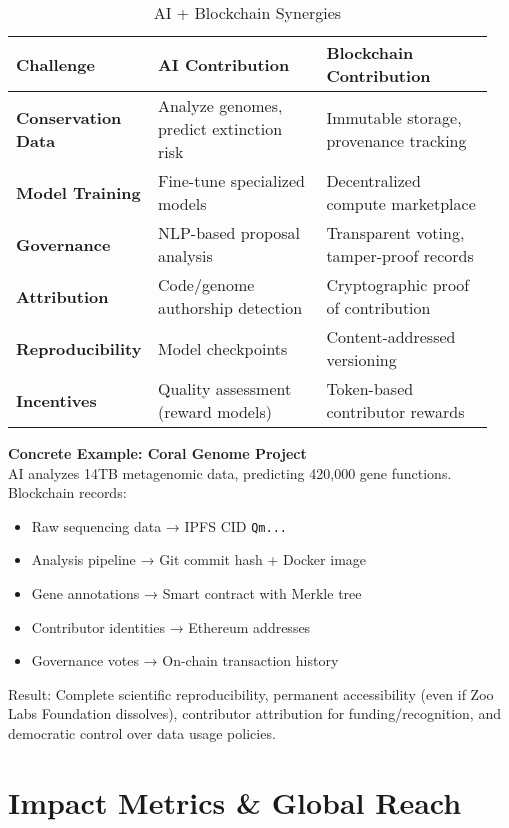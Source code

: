 \documentclass[twocolumn,11pt]{article}
\begin{document}
\begin{table*}[t]
\centering
\caption{AI + Blockchain Synergies}
\label{tab:synergies}
\begin{tabular}{@{}p{0.25\linewidth}p{0.35\linewidth}p{0.35\linewidth}@{}}
\toprule
\textbf{Challenge} & \textbf{AI Contribution} & \textbf{Blockchain Contribution} \\ \midrule
\textbf{Conservation Data} & Analyze genomes, predict extinction risk & Immutable storage, provenance tracking \\
\textbf{Model Training} & Fine-tune specialized models & Decentralized compute marketplace \\
\textbf{Governance} & NLP-based proposal analysis & Transparent voting, tamper-proof records \\
\textbf{Attribution} & Code/genome authorship detection & Cryptographic proof of contribution \\
\textbf{Reproducibility} & Model checkpoints & Content-addressed versioning \\
\textbf{Incentives} & Quality assessment (reward models) & Token-based contributor rewards \\
\bottomrule
\end{tabular}
\end{table*}

\textbf{Concrete Example: Coral Genome Project} \\
AI analyzes 14TB metagenomic data, predicting 420,000 gene functions. Blockchain records:
\begin{itemize}
    \item Raw sequencing data → IPFS CID \texttt{Qm...}
    \item Analysis pipeline → Git commit hash + Docker image
    \item Gene annotations → Smart contract with Merkle tree
    \item Contributor identities → Ethereum addresses
    \item Governance votes → On-chain transaction history
\end{itemize}

Result: Complete scientific reproducibility, permanent accessibility (even if Zoo Labs Foundation dissolves), contributor attribution for funding/recognition, and democratic control over data usage policies.

\section{Impact Metrics \& Global Reach}
\end{document}
